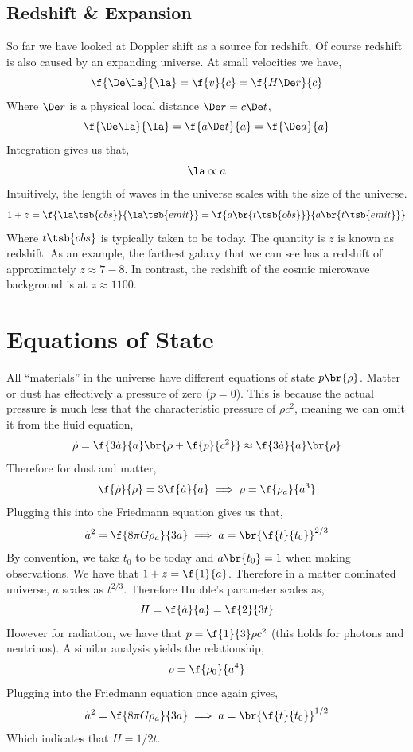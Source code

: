 \documentclass{article}
\begin{document}
\subsection{Redshift \& Expansion}
So far we have looked at Doppler shift as a source for redshift. Of course redshift is also caused by an expanding universe. At small velocities we have,
\[ \f{\De \la}{\la} = \f{v}{c} = \f{H \De r}{c} \]
Where $\De r$ is a physical local distance $\De r = c \De t$,
\[ \f{\De \la}{\la} = \f{\dot a \De t}{a} = \f{\De a}{a} \]
Integration gives us that,
\[ \la \propto a \]
Intuitively, the length of waves in the universe scales with the size of the universe.
\[ 1 + z = \f{\la\tsb{obs}}{\la\tsb{emit}} = \f{a\br{t\tsb{obs}}}{a\br{t\tsb{emit}}}  \]
Where $t\tsb{obs}$ is typically taken to be today. The quantity is $z$ is known as redshift. As an example, the farthest galaxy that we can see has a redshift of approximately $z \approx 7-8$. In contrast, the redshift of the cosmic microwave background is at $z \approx 1100$.

\section{Equations of State}
All ``materials'' in the universe have different equations of state $p\br{\rho}$. Matter or dust has effectively a pressure of zero ($p = 0$). This is because the actual pressure is much less that the characteristic pressure of $\rho c^2$, meaning we can omit it from the fluid equation,
\[ \dot\rho = \f{3 \dot a}{a} \br{\rho + \f{p}{c^2}} \approx \f{3 \dot a}{a} \br{\rho} \]
Therefore for dust and matter,
\[ \f{\dot \rho}{\rho} = 3\f{\dot a}{a} \implies \rho = \f{\rho_a}{a^3} \]
Plugging this into the Friedmann equation gives us that,
\[ \dot a^2 = \f{8\pi G \rho_a}{3a} \implies a = \br{\f{t}{t_0}}^{2/3} \]
By convention, we take $t_0$ to be today and $a\br{t_0} = 1$ when making observations. We have that $1 + z = \f{1}{a}$. Therefore in a matter dominated universe, $a$ scales as $t^{2/3}$. Therefore Hubble's parameter scales as,
\[ H = \f{\dot a}{a} = \f{2}{3t} \]
However for radiation, we have that $p = \f{1}{3} \rho c^2$ (this holds for photons and neutrinos). A similar analysis yields the relationship,
\[ \rho = \f{\rho_0}{a^4} \]
Plugging into the Friedmann equation once again gives,
\[ \dot a^2 = \f{8\pi G \rho_a}{3a} \implies a = \br{\f{t}{t_0}}^{1/2} \]
Which indicates that $H = 1/2t$. \\
\end{document}
